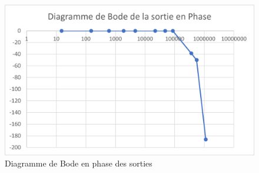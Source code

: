 \documentclass{report}
\begin{document}
\begin{figure}[h!]
\begin{center}
\includegraphics[scale=0.7]{IMAGES/phi_out.png} 
\end{center}
\caption{Diagramme de Bode en phase des sorties}
\label{fig:phiout}
\end{figure}

\thispagestyle{empty}
\printbibliography
\thispagestyle{empty}
\end{document}
